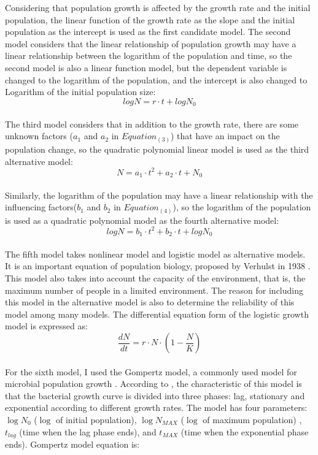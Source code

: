 \documentclass[11pt]{article}
\begin{document}
Considering that population growth is affected by the growth rate and the initial population, the linear function of the growth rate as the slope and the initial population as the intercept is used as the first candidate model.
The second model considers that the linear relationship of population growth may have a linear relationship between the logarithm of the population and time, so the second model is also a linear function model, but the dependent variable is changed to the logarithm of the population, and the intercept is also changed to Logarithm of the initial population size:
\begin{equation}
    {logN}={r}\cdot{t}+{logN_0}
\end{equation}
\\
The third model considers that in addition to the growth rate, there are some unknown factors ($a_1$ and $a_2$ in $Equation_(3)$) that have an impact on the population change, so the quadratic polynomial linear model is used as the third alternative model:
\begin{equation}
    {N}={a_1}\cdot{t^2}+{a_2}\cdot{t}+{N_0}
\end{equation}
\\
Similarly, the logarithm of the population may have a linear relationship with the influencing factors($b_1$ and $b_2$ in $Equation_(4)$), so the logarithm of the population is used as a quadratic polynomial model as the fourth alternative model:
\begin{equation}
    {logN}={b_1}\cdot{t^2}+{b_2}\cdot{t}+{logN_0}
\end{equation}
\\
The fifth model takes nonlinear model and logistic model as alternative models. It is an important equation of population biology, proposed by Verhulst in 1938 \citep{verhulst1838notice}. This model also takes into account the capacity of the environment, that is, the maximum number of people in a limited environment. The reason for including this model in the alternative model is also to determine the reliability of this model among many models. The differential equation form of the logistic growth model is expressed as:
\begin{equation}
    \frac{dN}{dt} = r\cdot N\cdot (1 - \frac{N}{K})
\end{equation}
\\
For the sixth model, I used the Gompertz model, a commonly used model for microbial population growth \citep{doi:10.1128/aem.56.6.1875-1881.1990}. According to \cite{BUCHANAN1997313}, the characteristic of this model is that the bacterial growth curve is divided into three phases: lag, stationary and exponential according to different growth rates. The model has four parameters: $\log N_{0}$ ($\log$ of initial population), $\log N_{MAX}$ ($\log$ of maximum population) , $t_{lag}$ (time when the lag phase ends), and $t_{MAX}$ (time when the exponential phase ends). Gompertz model equation is:
\end{document}
